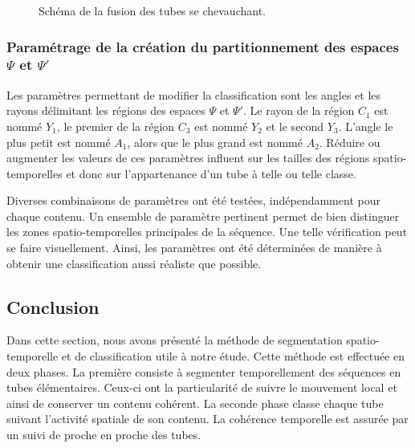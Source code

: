 \begin{figure}[htbp]
	\centering
	\begin{tikzpicture}[scale=1.5]
		
	\end{tikzpicture}
	\caption{Schéma de la fusion des tubes se chevauchant.}
  \label{fig:overlapTubes}
\end{figure}


\subsubsection{Paramétrage de la création du partitionnement des espaces \texorpdfstring{$\Psi$}{Psi} et \texorpdfstring{$\Psi'$}{Psi'}} \label{ssec:paramClass}
Les paramètres permettant de modifier la classification sont les angles et les rayons délimitant les régions des espaces $\Psi$ et $\Psi'$. Le rayon de la région $C_1$ est nommé $Y_1$, le premier de la région $C_3$ est nommé $Y_2$ et le second $Y_3$. L'angle le plus petit est nommé $A_1$, alors que le plus grand est nommé $A_2$. Réduire ou augmenter les valeurs de ces paramètres influent sur les tailles des régions spatio-temporelles et donc sur l'appartenance d'un tube à telle ou telle classe.

Diverses combinaisons de paramètres ont été testées, indépendamment pour chaque contenu. Un ensemble de paramètre pertinent permet de bien distinguer les zones spatio-temporelles principales de la séquence. Une telle vérification peut se faire visuellement. Ainsi, les paramètres ont été déterminées de manière à obtenir une classification aussi réaliste que possible.


\subsection{Conclusion}
Dans cette section, nous avons présenté la méthode de segmentation spatio-temporelle et de classification utile à notre étude. Cette méthode est effectuée en deux phases. La première consiste à segmenter temporellement des séquences en tubes élémentaires. Ceux-ci ont la particularité de suivre le mouvement local et ainsi de conserver un contenu cohérent. La seconde phase classe chaque tube suivant l'activité spatiale de son contenu. La cohérence temporelle est assurée par un suivi de proche en proche des tubes.


